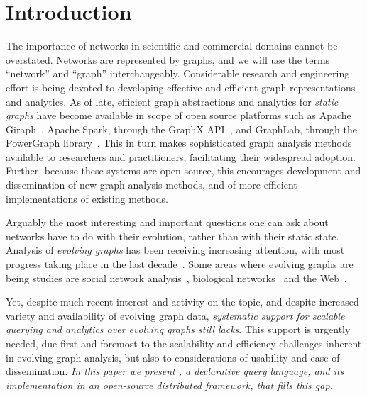 \section{Introduction}
\label{sec:intro}

The importance of networks in scientific and commercial domains cannot
be overstated.  Networks are represented by graphs, and we will use
the terms ``network'' and ``graph'' interchangeably.  Considerable
research and engineering effort is being devoted to developing
effective and efficient graph representations and analytics.  As of
late, efficient graph abstractions and analytics for {\em static
  graphs} have become available in scope of open source platforms such
as Apache Giraph~\cite{ApacheGiraph}, Apache Spark, through the GraphX
API~\cite{DBLP:conf/osdi/GonzalezXDCFS14}, and GraphLab, through the
PowerGraph library~\cite{DBLP:conf/osdi/GonzalezLGBG12}.  This in turn
makes sophisticated graph analysis methods available to researchers
and practitioners, facilitating their widespread adoption.  Further,
because these systems are open source, this encourages development and
dissemination of new graph analysis methods, and of more efficient
implementations of existing methods.

Arguably the most interesting and important questions one can ask
about networks have to do with their evolution, rather than with their
static state.  Analysis of {\em evolving graphs} has been receiving
increasing attention, with most progress taking place in the last
decade~\cite{DBLP:journals/csur/AggarwalS14,Chan2008,Kan2009,DBLP:journals/tos/MiaoHLWYZPCC15,Ren2011,Semertzidis2015}.
Some areas where evolving graphs are being studies are social network
analysis~\cite{DBLP:conf/icwsm/GoetzLMF09,DBLP:journals/tweb/LeskovecAH07,DBLP:conf/kdd/LeskovecBKT08,DBLP:conf/icml/SarkarCJ12},
biological networks~\cite{DBLP:journals/tkdd/AsurPU09,DBLP:journals/tcsb/BeyerTLSF10,Stuart2003} and the Web~\cite{DBLP:journals/kais/ChanBL08,DBLP:journals/jisa/PapadimitriouDG10}.

Yet, despite much recent interest and activity on the topic, and
despite increased variety and availability of evolving graph data,
{\em systematic support for scalable querying and analytics over
  evolving graphs still lacks}.  This support is urgently needed, due
first and foremost to the scalability and efficiency challenges
inherent in evolving graph analysis, but also to considerations of
usability and ease of dissemination.  {\em In this paper we present
  \ql, a declarative query language, and its implementation in an
  open-source distributed framework, that fills this gap.}

